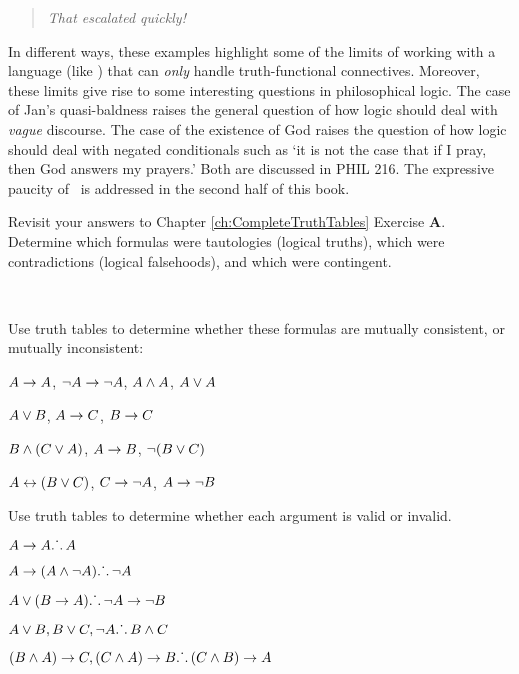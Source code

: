 \documentclass[PHIL101-Textbook.tex]{subfiles}
\begin{document}
\begin{quote}\emph{That escalated quickly!}\end{quote}
                
In different ways, these examples highlight some of the limits of working with a language (like \tfl) that can \emph{only} handle truth-functional connectives. Moreover, these limits give rise to some interesting questions in philosophical logic. 
The case of Jan's quasi-baldness raises the general question of how logic should deal with \emph{vague} discourse.
The case of the existence of God raises the question of how logic should deal with negated conditionals such as `it is not the case that if I pray, then God answers my prayers.' Both are discussed in PHIL 216. 
The expressive paucity of \tfl\ is addressed in the second half of this book.



\pagebreak
\practiceproblems
\problempart
Revisit your answers to Chapter \ref{ch:CompleteTruthTables} Exercise \textbf{A}. Determine which formulas were tautologies (logical truths), which were contradictions (logical falsehoods), and which were contingent. 

\

\noindent\solutions
\problempart\label{pr.TT.consistent}
Use truth tables to determine whether these formulas are mutually consistent, or mutually inconsistent:
\begin{earg}
\item $A\rightarrow A$, $\neg A \rightarrow \neg A$, $A\land A$, $A\vee A$ %
\item $A\vee B$, $A\rightarrow C$, $B\rightarrow C$ %
\item $B\land(C\vee A)$, $A\rightarrow B$, $\neg(B\vee C)$  %
\item $A\leftrightarrow(B\vee C)$, $C\rightarrow \neg A$, $A\rightarrow \neg B$ %
\end{earg}


\noindent\solutions
\problempart
\label{pr.TT.valid}
Use truth tables to determine whether each argument is valid or invalid.
\begin{earg}
\item $A\rightarrow A \ldotp\dot{}\,\ldotp A$ %
\item $A\rightarrow(A\land\neg A) \ldotp\dot{}\,\ldotp \neg A$ %
\item $A\vee(B\rightarrow A) \ldotp\dot{}\,\ldotp \neg A \rightarrow \neg B$ %
\item $A\vee B, B\vee C, \neg A \ldotp\dot{}\,\ldotp B \land C$ %
\item $(B\land A)\rightarrow C, (C\land A)\rightarrow B \ldotp\dot{}\,\ldotp (C\land B)\rightarrow A$ %
\end{earg}
\end{document}
